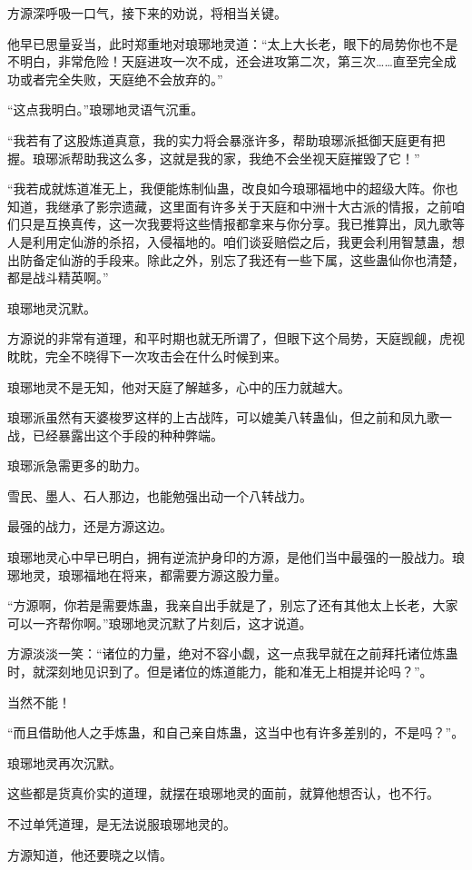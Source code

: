 \begin{this_body}
方源深呼吸一口气，接下来的劝说，将相当关键。

他早已思量妥当，此时郑重地对琅琊地灵道：“太上大长老，眼下的局势你也不是不明白，非常危险！天庭进攻一次不成，还会进攻第二次，第三次……直至完全成功或者完全失败，天庭绝不会放弃的。”

“这点我明白。”琅琊地灵语气沉重。

“我若有了这股炼道真意，我的实力将会暴涨许多，帮助琅琊派抵御天庭更有把握。琅琊派帮助我这么多，这就是我的家，我绝不会坐视天庭摧毁了它！”

“我若成就炼道准无上，我便能炼制仙蛊，改良如今琅琊福地中的超级大阵。你也知道，我继承了影宗遗藏，这里面有许多关于天庭和中洲十大古派的情报，之前咱们只是互换真传，这一次我要将这些情报都拿来与你分享。我已推算出，凤九歌等人是利用定仙游的杀招，入侵福地的。咱们谈妥赔偿之后，我更会利用智慧蛊，想出防备定仙游的手段来。除此之外，别忘了我还有一些下属，这些蛊仙你也清楚，都是战斗精英啊。”

琅琊地灵沉默。

方源说的非常有道理，和平时期也就无所谓了，但眼下这个局势，天庭觊觎，虎视眈眈，完全不晓得下一次攻击会在什么时候到来。

琅琊地灵不是无知，他对天庭了解越多，心中的压力就越大。

琅琊派虽然有天婆梭罗这样的上古战阵，可以媲美八转蛊仙，但之前和凤九歌一战，已经暴露出这个手段的种种弊端。

琅琊派急需更多的助力。

雪民、墨人、石人那边，也能勉强出动一个八转战力。

最强的战力，还是方源这边。

琅琊地灵心中早已明白，拥有逆流护身印的方源，是他们当中最强的一股战力。琅琊地灵，琅琊福地在将来，都需要方源这股力量。

“方源啊，你若是需要炼蛊，我亲自出手就是了，别忘了还有其他太上长老，大家可以一齐帮你啊。”琅琊地灵沉默了片刻后，这才说道。

方源淡淡一笑：“诸位的力量，绝对不容小觑，这一点我早就在之前拜托诸位炼蛊时，就深刻地见识到了。但是诸位的炼道能力，能和准无上相提并论吗？”。

当然不能！

“而且借助他人之手炼蛊，和自己亲自炼蛊，这当中也有许多差别的，不是吗？”。

琅琊地灵再次沉默。

这些都是货真价实的道理，就摆在琅琊地灵的面前，就算他想否认，也不行。

不过单凭道理，是无法说服琅琊地灵的。

方源知道，他还要晓之以情。


\end{this_body}
